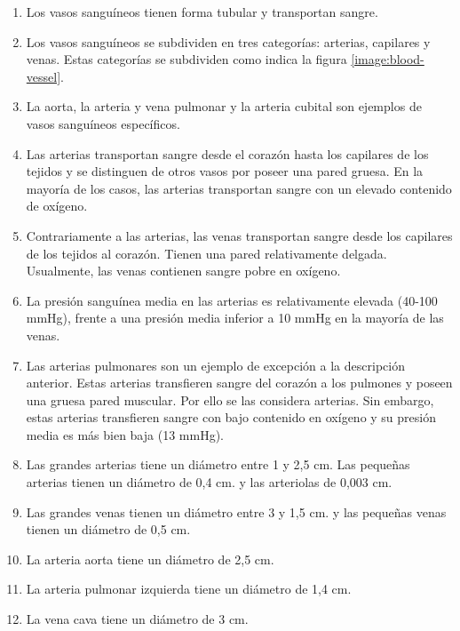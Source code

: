 \documentclass[10pt, a4paper,spanish]{article}
\begin{document}
    \begin{enumerate}[label=\alph*)]

      \item Los vasos sanguíneos tienen forma tubular y transportan sangre.

      \item Los vasos sanguíneos se subdividen en tres categorías: arterias, capilares y venas. Estas categorías se subdividen como indica la figura \ref{image:blood-vessel}.

      \item La aorta, la arteria y vena pulmonar y la arteria cubital son ejemplos de vasos sanguíneos específicos.

      \item Las arterias transportan sangre desde el corazón hasta los capilares de los tejidos y se distinguen de otros vasos por poseer una pared gruesa. En la mayoría de los casos, las arterias transportan sangre con un elevado contenido de oxígeno.

      \item Contrariamente a las arterias, las venas transportan sangre desde los capilares de los tejidos al corazón. Tienen una pared relativamente delgada. Usualmente, las venas contienen sangre pobre en oxígeno.

      \item La presión sanguínea media en las arterias es relativamente elevada (40-100 mmHg), frente a una presión media inferior a 10 mmHg en la mayoría de las venas.

      \item Las arterias pulmonares son un ejemplo de excepción a la descripción anterior. Estas arterias transfieren sangre del corazón a los pulmones y poseen una gruesa pared muscular. Por ello se las considera arterias. Sin embargo, estas arterias transfieren sangre con bajo contenido en oxígeno y su presión media es más bien baja (13 mmHg).

      \item Las grandes arterias tiene un diámetro entre 1 y 2,5 cm. Las pequeñas arterias tienen un diámetro de 0,4 cm. y las arteriolas de 0,003 cm.

      \item Las grandes venas tienen un diámetro entre 3 y 1,5 cm. y las pequeñas venas tienen un diámetro de 0,5 cm.

      \item La arteria aorta tiene un diámetro de 2,5 cm.

      \item La arteria pulmonar izquierda tiene un diámetro de 1,4 cm.

      \item La vena cava tiene un diámetro de 3 cm.

    \end{enumerate}
\end{document}
